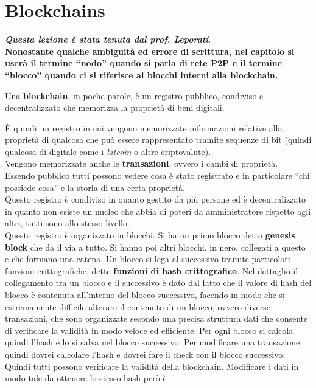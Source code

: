 \documentclass[a4paper,12pt, oneside]{book}
\begin{document}
\chapter{Blockchains}
\textbf{\textit{Questa lezione è stata tenuta dal prof. Leporati}}.\\
\textbf{Nonostante qualche ambiguità ed errore di scrittura, nel capitolo si
  userà il termine ``nodo'' 
  quando si parla di rete P2P e il termine ``blocco'' quando ci si riferisce ai
  blocchi interni alla blockchain.}
\begin{definizione}
  Una \textbf{blockchain}, in poche parole, è un registro pubblico, condiviso e
  decentralizzato che memorizza la proprietà di beni digitali. 
\end{definizione}
È quindi un registro in cui vengono memorizzate informazioni relative alla
proprietà di qualcosa che può essere rappresentato tramite sequenze di bit
(quindi qualcosa di digitale come i \textit{bitcoin} o altre criptovalute).\\
Vengono memorizzate anche le \textbf{transazioni}, ovvero i cambi di
proprietà.\\
Essendo pubblico tutti possono vedere cosa è stato registrato e in particolare
``chi possiede cosa'' e la storia di una certa proprietà.\\
Questo registro è condiviso in quanto gestito da più persone ed è
decentralizzato in quanto non esiste un nucleo che abbia di poteri da
amministratore rispetto agli altri, tutti sono allo stesso livello.
\\
Questo registro è organizzato in blocchi. Si ha un primo blocco detto
\textbf{genesis block} che da il via a tutto. Si hanno poi altri blocchi, in
nero, collegati a questo e che formano una catena. Un blocco si lega al
successivo tramite particolari funzioni crittografiche, dette \textbf{funzioni
  di hash crittografico}. Nel dettaglio il collegamento tra un blocco e il
successivo è dato dal fatto che il valore di hash del blocco è contenuta
all'interno del blocco successivo, facendo in modo che si estremamente
difficile alterare il contenuto di un blocco, ovvero diverse transazioni, che
sono organizzate secondo una precisa struttura dati che consente di verificare
la validità in modo veloce ed efficiente. Per ogni blocco si calcola quindi
l'hash e lo si salva nel blocco successivo. Per modificare una transazione
quindi dovrei calcolare l'hash e dovrei fare il check con il blocco
successivo. Quindi tutti possono verificare la validità della
blockchain. Modificare i dati in modo tale da ottenere lo stesso hash però è
\end{document}
